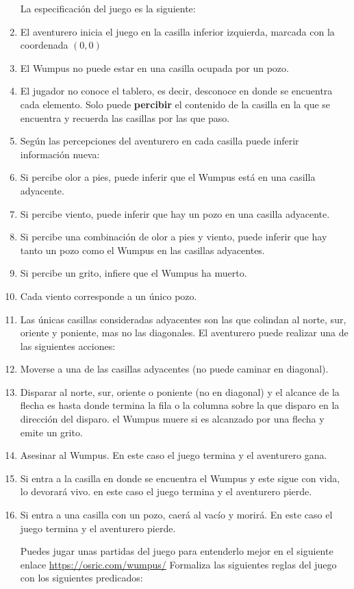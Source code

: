 \documentclass[11pt,letterpaper]{article}
\begin{document}
\begin{enumerate}
  La especificación del juego es la siguiente:
  \bi
\item El aventurero inicia el juego en la casilla inferior izquierda, marcada con la coordenada $(0,0)$
\item El Wumpus no puede estar en una casilla ocupada por un pozo.
\item El jugador no conoce el tablero, es decir, desconoce en donde se encuentra cada elemento. Solo puede {\bf percibir} el contenido de la casilla en la que se encuentra y recuerda las casillas por las que paso.
\item Según las percepciones del aventurero en cada casilla puede inferir información nueva:
  \bi
\item Si percibe olor a pies, puede inferir que el Wumpus está en una casilla adyacente.
\item Si percibe viento, puede inferir que hay un pozo en una casilla adyacente.
\item Si percibe una combinación de olor a pies y viento, puede inferir que hay tanto un pozo como el Wumpus en las casillas adyacentes.
\item Si percibe un grito, infiere que el Wumpus ha muerto.
  \ei 
\item Cada viento corresponde a un único pozo. 
\item Las únicas casillas consideradas adyacentes son las que colindan al norte, sur, oriente y poniente, mas no las diagonales.
  \ei
  El aventurero puede realizar una de las siguientes acciones:
  \bi
\item Moverse a una de las casillas adyacentes (no puede caminar en diagonal).
\item Disparar al norte, sur, oriente o poniente (no en diagonal) y el alcance de la flecha es hasta donde termina la fila o la columna sobre la que disparo en la dirección del disparo. el Wumpus muere si es alcanzado por una flecha y emite un grito.
\item Asesinar al Wumpus. En este caso el juego termina y el aventurero gana.
\item Si entra a la casilla en donde se encuentra el Wumpus y este sigue con vida, lo devorará vivo. en este caso el juego termina y el aventurero pierde.
\item Si entra a una casilla con un pozo, caerá al vacío y morirá. En este caso el juego termina y el aventurero pierde.
  \ei
  
  Puedes jugar unas partidas del juego para entenderlo mejor en el siguiente enlace \url{https://osric.com/wumpus/}
  Formaliza las siguientes reglas del juego con los siguientes predicados:


\end{enumerate}
\end{document}
